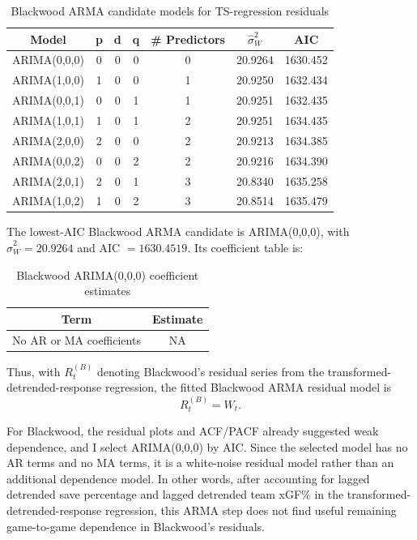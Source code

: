 \documentclass[
  10pt,
]{extarticle}
\begin{document}
\begin{center}
\scriptsize
\begin{table}[H]

\caption{\label{tab:p2-arma-blackwood-table}Blackwood ARMA candidate models for TS-regression residuals}
\centering
\begin{tabular}[t]{ccccccc}
\toprule
Model & p & d & q & \# Predictors & $\hat{\sigma}_W^2$ & AIC\\
\midrule
ARIMA(0,0,0) & 0 & 0 & 0 & 0 & 20.9264 & 1630.452\\
ARIMA(1,0,0) & 1 & 0 & 0 & 1 & 20.9250 & 1632.434\\
ARIMA(0,0,1) & 0 & 0 & 1 & 1 & 20.9251 & 1632.435\\
ARIMA(1,0,1) & 1 & 0 & 1 & 2 & 20.9251 & 1634.435\\
ARIMA(2,0,0) & 2 & 0 & 0 & 2 & 20.9213 & 1634.385\\
\addlinespace
ARIMA(0,0,2) & 0 & 0 & 2 & 2 & 20.9216 & 1634.390\\
ARIMA(2,0,1) & 2 & 0 & 1 & 3 & 20.8340 & 1635.258\\
ARIMA(1,0,2) & 1 & 0 & 2 & 3 & 20.8514 & 1635.479\\
\bottomrule
\end{tabular}
\end{table}
\normalsize
\end{center}

The lowest-AIC Blackwood ARMA candidate is ARIMA(0,0,0), with \(\hat{\sigma}_W^2 = 20.9264\) and AIC \(= 1630.4519\). Its coefficient table is:

\begin{center}
\scriptsize
\begin{table}[H]

\caption{\label{tab:p2-arma-blackwood-coef}Blackwood ARIMA(0,0,0) coefficient estimates}
\centering
\begin{tabular}[t]{cc}
\toprule
Term & Estimate\\
\midrule
No AR or MA coefficients & NA\\
\bottomrule
\end{tabular}
\end{table}
\normalsize
\end{center}

Thus, with \(R_t^{(B)}\) denoting Blackwood's residual series from the transformed-detrended-response regression, the fitted Blackwood ARMA residual model is
\[
R_t^{(B)} = W_t.
\]

For Blackwood, the residual plots and ACF/PACF already suggested weak dependence, and I select ARIMA(0,0,0) by AIC. Since the selected model has no AR terms and no MA terms, it is a white-noise residual model rather than an additional dependence model. In other words, after accounting for lagged detrended save percentage and lagged detrended team xGF\% in the transformed-detrended-response regression, this ARMA step does not find useful remaining game-to-game dependence in Blackwood's residuals.
\end{document}

